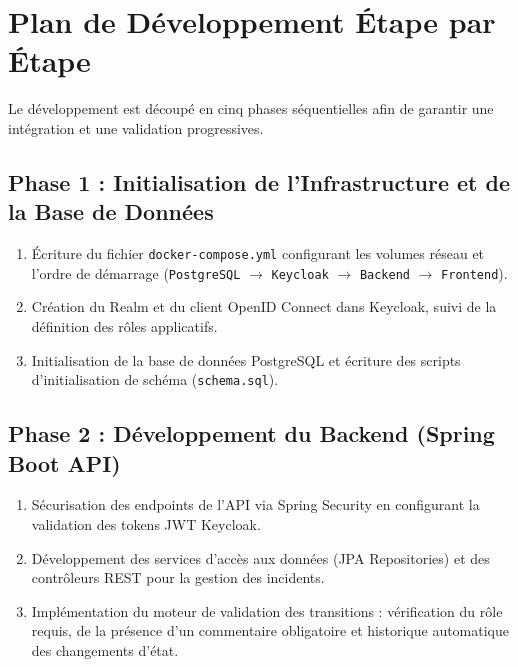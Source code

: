 \documentclass[12pt,a4paper]{article}
\begin{document}
\section{Plan de Développement Étape par Étape}
Le développement est découpé en cinq phases séquentielles afin de garantir une intégration et une validation progressives.

\subsection{Phase 1 : Initialisation de l'Infrastructure et de la Base de Données}
\begin{enumerate}
    \item Écriture du fichier \texttt{docker-compose.yml} configurant les volumes réseau et l'ordre de démarrage (\texttt{PostgreSQL} $\rightarrow$ \texttt{Keycloak} $\rightarrow$ \texttt{Backend} $\rightarrow$ \texttt{Frontend}).
    \item Création du Realm et du client OpenID Connect dans Keycloak, suivi de la définition des rôles applicatifs.
    \item Initialisation de la base de données PostgreSQL et écriture des scripts d'initialisation de schéma (\texttt{schema.sql}).
\end{enumerate}

\subsection{Phase 2 : Développement du Backend (Spring Boot API)}
\begin{enumerate}
    \item Sécurisation des endpoints de l'API via Spring Security en configurant la validation des tokens JWT Keycloak.
    \item Développement des services d'accès aux données (JPA Repositories) et des contrôleurs REST pour la gestion des incidents.
    \item Implémentation du moteur de validation des transitions : vérification du rôle requis, de la présence d'un commentaire obligatoire et historique automatique des changements d'état.
\end{enumerate}
\end{document}
